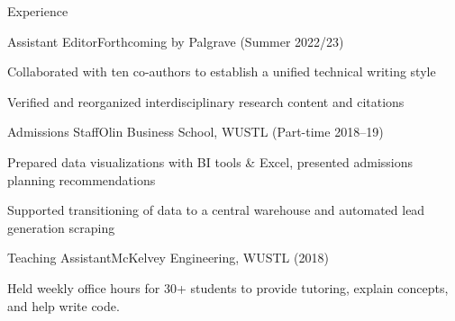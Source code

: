   \begin{rSection}{Experience}

    \begin{rSubsection}{Assistant Editor}{Forthcoming by Palgrave (Summer 2022/23)}{}{}%
    \item Collaborated with ten co-authors to establish a unified technical writing style
    \item Verified and reorganized interdisciplinary research content and citations
    \end{rSubsection}


    \begin{rSubsection}{Admissions Staff}{Olin Business School, WUSTL (Part-time 2018--19)}{}{}
    \item Prepared data visualizations with BI tools \& Excel, presented admissions planning recommendations
    \item Supported transitioning of data to a central warehouse and automated lead generation scraping
    \end{rSubsection}

    \begin{rSubsection}{Teaching Assistant}{McKelvey Engineering, WUSTL (2018)}{}{}%
    \item Held weekly office hours for 30+ students to provide tutoring, explain concepts, and help write code.
    \end{rSubsection}


\end{rSection}
